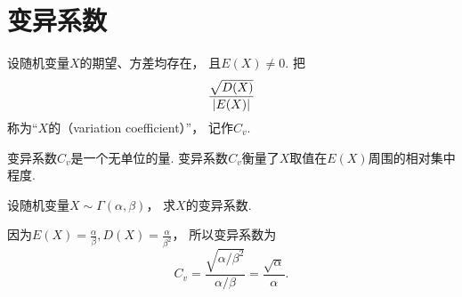 \section{变异系数}
\begin{definition}
设随机变量\(X\)的期望、方差均存在，
且\(E(X) \neq 0\).
把\begin{equation*}
	\frac{\sqrt{D(X)}}{\abs{E(X)}}
\end{equation*}
称为“\(X\)的（variation coefficient）”，
记作\(C_v\).
\end{definition}
变异系数\(C_v\)是一个无单位的量.
变异系数\(C_v\)衡量了\(X\)取值在\(E(X)\)周围的相对集中程度.

\begin{example}
设随机变量\(X \sim \Gamma(\alpha,\beta)\)，
求\(X\)的变异系数.
\begin{solution}
因为\(E(X)=\frac\alpha\beta,
D(X)=\frac{\alpha}{\beta^2}\)，
所以变异系数为\begin{equation*}
	C_v = \frac{\sqrt{\alpha/\beta^2}}{\alpha/\beta}
	= \frac{\sqrt{\alpha}}{\alpha}.
\end{equation*}
\end{solution}
\end{example}
